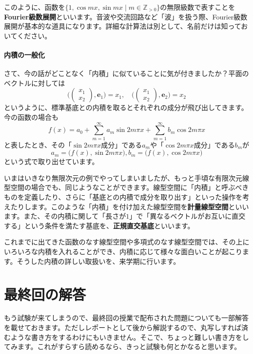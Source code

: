 このように、函数を$\{1, \cos mx, \sin mx \mid m\in\mathbb{Z}_{>0}\}$の無限級数で表すことを\textbf{Fourier級数展開}といいます。音波や交流回路など「波」を扱う際、Fourier級数展開が基本的な道具になります。詳細な計算法は別として、名前だけは知っておいてください。

\paragraph{内積の一般化}

さて、今の話がどことなく「内積」に似ていることに気が付きましたか？平面のベクトルに対しては
\[
\biggl(
\begin{pmatrix}
x_1 \\
x_2
\end{pmatrix}, 
\bm{e}_1
\biggr)
=
x_1, \quad
\biggl(
\begin{pmatrix}
x_1 \\
x_2
\end{pmatrix}, 
\bm{e}_2
\biggr)
=
x_2
\]
というように、標準基底との内積を取るとそれぞれの成分が飛び出してきます。今の函数の場合も
\[
f(x) = a_0 + \sum_{m = 1}^{\infty} a_m \sin 2m\pi x + \sum_{m = 1}^{\infty} b_m \cos 2m \pi x
\]
と表したとき、その「$\sin 2m \pi x$成分」である$a_m$や「$\cos 2m \pi x$成分」である$b_m$が
\[
a_m = \bigl(f(x), \sin 2m\pi x\bigr), b_m = \bigl(f(x), \cos 2m \pi x\bigr)
\]
という式で取り出せています。

いまはいきなり無限次元の例でやってしまいましたが、もっと手頃な有限次元線型空間の場合でも、同じようなことができます。線型空間に「内積」と呼ぶべきものを定義したり、さらに「基底との内積で成分を取り出す」といった操作を考えたりします。このような「内積」を付け加えた線型空間を\textbf{計量線型空間}といいます。また、その内積に関して「長さが$1$」で「異なるベクトルがお互いに直交する」という条件を満たす基底を、\textbf{正規直交基底}といいます。

これまでに出てきた函数のなす線型空間や多項式のなす線型空間では、その上にいろいろな内積を入れることができ、内積に応じて様々な面白いことが起こります。そうした内積の詳しい取扱いを、来学期に行います。

\section{最終回の解答}

もう試験が来てしまうので、最終回の授業で配布された問題についても一部解答を載せておきます。ただしレポートとして後から解説するので、丸写しすれば済むような書き方をするわけにもいきません。そこで、ちょっと難しい書き方をしてみます。これがすらすら読めるなら、きっと試験も何とかなると思います。


